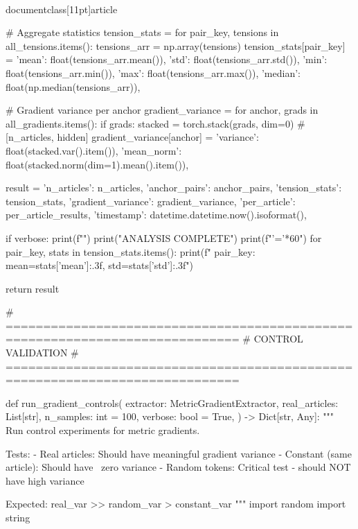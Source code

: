 \\documentclass[11pt]{article}
\begin{document}
\begin{CodeBlock}
        # Aggregate statistics
        tension_stats = {}
        for pair_key, tensions in all_tensions.items():
            tensions_arr = np.array(tensions)
            tension_stats[pair_key] = {
                'mean': float(tensions_arr.mean()),
                'std': float(tensions_arr.std()),
                'min': float(tensions_arr.min()),
                'max': float(tensions_arr.max()),
                'median': float(np.median(tensions_arr)),
            }
        
        # Gradient variance per anchor
        gradient_variance = {}
        for anchor, grads in all_gradients.items():
            if grads:
                stacked = torch.stack(grads, dim=0)  # [n_articles, hidden]
                gradient_variance[anchor] = {
                    'variance': float(stacked.var().item()),
                    'mean_norm': float(stacked.norm(dim=1).mean().item()),
                }
        
        result = {
            'n_articles': n_articles,
            'anchor_pairs': anchor_pairs,
            'tension_stats': tension_stats,
            'gradient_variance': gradient_variance,
            'per_article': per_article_results,
            'timestamp': datetime.datetime.now().isoformat(),
        }
        
        if verbose:
            print(f"")
            print("ANALYSIS COMPLETE")
            print(f"{'='*60}")
            for pair_key, stats in tension_stats.items():
                print(f"  {pair_key}: mean={stats['mean']:.3f}, std={stats['std']:.3f}")
        
        return result


# =============================================================================
# CONTROL VALIDATION
# =============================================================================

def run_gradient_controls(
    extractor: MetricGradientExtractor,
    real_articles: List[str],
    n_samples: int = 100,
    verbose: bool = True,
) -> Dict[str, Any]:
    """
    Run control experiments for metric gradients.
    
    Tests:
    - Real articles: Should have meaningful gradient variance
    - Constant (same article): Should have ~zero variance
    - Random tokens: Critical test - should NOT have high variance
    
    Expected: real_var >> random_var > constant_var
    """
    import random
    import string
    

\end{CodeBlock}
\end{document}
